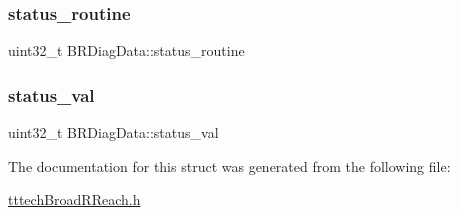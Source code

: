 \subsubsection{\texorpdfstring{status\+\_\+routine}{status\_routine}}
{\footnotesize\ttfamily uint32\+\_\+t B\+R\+Diag\+Data\+::status\+\_\+routine}

\mbox{\label{struct_b_r_diag_data_a1b6c0080fff5bddfc534cf9b50d52564}} 
\subsubsection{\texorpdfstring{status\+\_\+val}{status\_val}}
{\footnotesize\ttfamily uint32\+\_\+t B\+R\+Diag\+Data\+::status\+\_\+val}



The documentation for this struct was generated from the following file\+:\begin{DoxyCompactItemize}
\item 
\mbox{\hyperlink{tttech_broad_r_reach_8h}{tttech\+Broad\+R\+Reach.\+h}}\end{DoxyCompactItemize}
